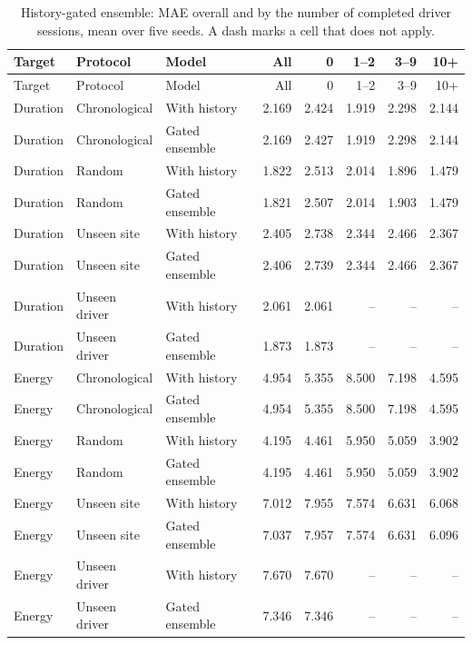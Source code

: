 {\footnotesize\begin{longtable}{lllrrrrr}
\caption{History-gated ensemble: MAE overall and by the number of completed driver sessions, mean over five seeds. A dash marks a cell that does not apply.}\label{tab:s-hrge}\\
\toprule
Target & Protocol & Model & All & 0 & 1--2 & 3--9 & 10+ \\
\midrule
\endfirsthead
\toprule
Target & Protocol & Model & All & 0 & 1--2 & 3--9 & 10+ \\
\midrule
\endhead
\bottomrule
\endfoot
Duration & Chronological & With history & 2.169 & 2.424 & 1.919 & 2.298 & 2.144 \\
Duration & Chronological & Gated ensemble & 2.169 & 2.427 & 1.919 & 2.298 & 2.144 \\
Duration & Random & With history & 1.822 & 2.513 & 2.014 & 1.896 & 1.479 \\
Duration & Random & Gated ensemble & 1.821 & 2.507 & 2.014 & 1.903 & 1.479 \\
Duration & Unseen site & With history & 2.405 & 2.738 & 2.344 & 2.466 & 2.367 \\
Duration & Unseen site & Gated ensemble & 2.406 & 2.739 & 2.344 & 2.466 & 2.367 \\
Duration & Unseen driver & With history & 2.061 & 2.061 & -- & -- & -- \\
Duration & Unseen driver & Gated ensemble & 1.873 & 1.873 & -- & -- & -- \\
Energy & Chronological & With history & 4.954 & 5.355 & 8.500 & 7.198 & 4.595 \\
Energy & Chronological & Gated ensemble & 4.954 & 5.355 & 8.500 & 7.198 & 4.595 \\
Energy & Random & With history & 4.195 & 4.461 & 5.950 & 5.059 & 3.902 \\
Energy & Random & Gated ensemble & 4.195 & 4.461 & 5.950 & 5.059 & 3.902 \\
Energy & Unseen site & With history & 7.012 & 7.955 & 7.574 & 6.631 & 6.068 \\
Energy & Unseen site & Gated ensemble & 7.037 & 7.957 & 7.574 & 6.631 & 6.096 \\
Energy & Unseen driver & With history & 7.670 & 7.670 & -- & -- & -- \\
Energy & Unseen driver & Gated ensemble & 7.346 & 7.346 & -- & -- & -- \\
\end{longtable}}


